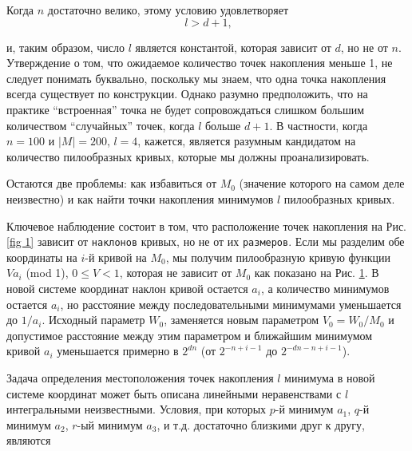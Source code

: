 \documentclass[a4paper,12pt]{report}
\newcommand{\mono}[1]{{\small\texttt{#1}}}
\begin{document}
\noindent Когда $n$ достаточно велико, этому условию удовлетворяет 
\[
\ l > d + 1,
\]

\noindent и, таким образом, число $l$ является константой, которая зависит от $d$, но не от $n$. Утверждение о том, что ожидаемое количество точек накопления меньше 1, не следует понимать буквально, поскольку мы знаем, что одна точка накопления всегда существует по конструкции. Однако разумно предположить, что на практике “встроенная” точка не будет сопровождаться слишком большим количеством “случайных” точек, когда $l$ больше $d + 1$. В частности, когда $n = 100$ и $|M| = 200$, $l = 4$, кажется, является разумным кандидатом на количество пилообразных кривых, которые мы должны проанализировать.

Остаются две проблемы: как избавиться от $M_0$ (значение которого на самом деле неизвестно) и как найти точки накопления минимумов $l$ пилообразных кривых.

Ключевое наблюдение состоит в том, что расположение точек накопления на Рис. \ref{fig 1} зависит от \mono{наклонов} кривых, но не от их \mono{размеров}. Если мы разделим обе координаты на $i$-й кривой на $M_0$, мы получим пилообразную кривую функции $Va_i$ (mod 1), $0 \leq V < 1$, которая не зависит от $M_0$ как показано на Рис. \ref{fig 2}. В новой системе координат наклон кривой остается $a_i$, а количество минимумов остается $a_i$, но расстояние между последовательными минимумами уменьшается до $1 / a_i$. Исходный параметр $W_0$, заменяется новым параметром $V_0 = W_0 / M_0$ и допустимое расстояние между этим параметром и ближайшим минимумом кривой $a_i$ уменьшается примерно в $2^{dn}$ (от $2^{-n + i - 1}$ до $2^{-dn - n + i - 1}$).

Задача определения местоположения точек накопления $l$ минимума в новой системе координат может быть описана линейными неравенствами с $l$ интегральными неизвестными. Условия, при которых $p$-й минимум $a_1$, $q$-й минимум $a_2$, $r$-ый минимум $a_3$, и т.д. достаточно близкими друг к другу, являются

\begin{figure}[h]
\centering
{}
\caption{}\label{fig 2}
\end{figure}
\end{document}
